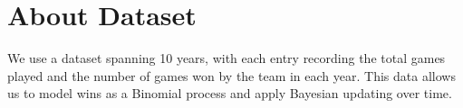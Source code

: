 \section{About Dataset}

We use a dataset spanning 10 years, with each entry recording the total games played and the number of games won by the team in each year.
This data allows us to model wins as a Binomial process and apply Bayesian updating over time.
